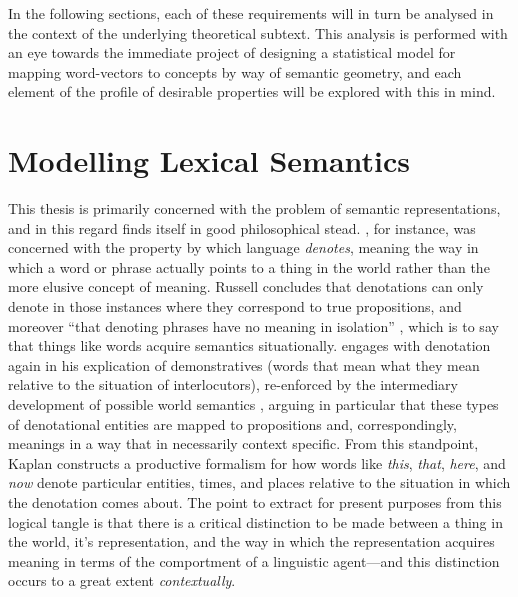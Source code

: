 In the following sections, each of these requirements will in turn be analysed in the context of the underlying theoretical subtext.  This analysis is performed with an eye towards the immediate project of designing a statistical model for mapping word-vectors to concepts by way of semantic geometry, and each element of the profile of desirable properties will be explored with this in mind.

\section{Modelling Lexical Semantics} \label{chap:lexsem}
This thesis is primarily concerned with the problem of semantic representations, and in this regard finds itself in good philosophical stead.  \citeauthor{Russell1905}, for instance, was concerned with the property by which language \emph{denotes}, meaning the way in which a word or phrase actually points to a thing in the world rather than the more elusive concept of meaning.  Russell concludes that denotations can only denote in those instances where they correspond to true propositions, and moreover ``that denoting phrases have no meaning in isolation'' \citep[][p. 192]{Russell1905}, which is to say that things like words acquire semantics situationally.  \cite{Kaplan1979} engages with denotation again in his explication of demonstratives (words that mean what they mean relative to the situation of interlocutors), re-enforced by the intermediary development of possible world semantics \citep{Carnap1947}, arguing in particular that these types of denotational entities are mapped to propositions and, correspondingly, meanings in a way that in necessarily context specific.  From this standpoint, Kaplan constructs a productive formalism for how words like \emph{this}, \emph{that}, \emph{here}, and \emph{now} denote particular entities, times, and places relative to the situation in which the denotation comes about.  The point to extract for present purposes from this logical tangle is that there is a critical distinction to be made between a thing in the world, it's representation, and the way in which the representation acquires meaning in terms of the comportment of a linguistic agent---and this distinction occurs to a great extent \emph{contextually}.

